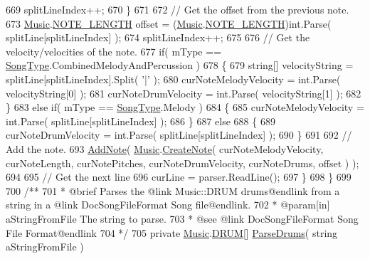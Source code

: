 \begin{DoxyCodeInclude}
669                 splitLineIndex++;
670             \}
671 
672             \textcolor{comment}{// Get the offset from the previous note.}
673             \hyperlink{class_music}{Music}.\hyperlink{group___music_enums_gaf11b5f079adbb21c800b9eca1c5c3cbd}{NOTE\_LENGTH} offset = (\hyperlink{class_music}{Music}.\hyperlink{group___music_enums_gaf11b5f079adbb21c800b9eca1c5c3cbd}{NOTE\_LENGTH})\textcolor{keywordtype}{int}.Parse( 
      splitLine[splitLineIndex] );
674             splitLineIndex++;
675 
676             \textcolor{comment}{// Get the velocity/velocities of the note.}
677             \textcolor{keywordflow}{if}( mType == \hyperlink{group___song_enums_gae681a1f001333e39fc1cb4fea97bfe1b}{SongType}.CombinedMelodyAndPercussion )
678             \{
679                 \textcolor{keywordtype}{string}[] velocityString = splitLine[splitLineIndex].Split( \textcolor{charliteral}{'|'} );
680                 curNoteMelodyVelocity = \textcolor{keywordtype}{int}.Parse( velocityString[0] );
681                 curNoteDrumVelocity = \textcolor{keywordtype}{int}.Parse( velocityString[1] );
682             \}
683             \textcolor{keywordflow}{else} \textcolor{keywordflow}{if}( mType == \hyperlink{group___song_enums_gae681a1f001333e39fc1cb4fea97bfe1b}{SongType}.Melody )
684             \{
685                 curNoteMelodyVelocity = \textcolor{keywordtype}{int}.Parse( splitLine[splitLineIndex] );
686             \}
687             \textcolor{keywordflow}{else}
688             \{
689                 curNoteDrumVelocity = \textcolor{keywordtype}{int}.Parse( splitLine[splitLineIndex] );
690             \}
691 
692             \textcolor{comment}{// Add the note.}
693             \hyperlink{group___song_pub_func_gab7c8fe4dc29f5ae7b7728c583fe51f7e}{AddNote}( \hyperlink{class_music}{Music}.\hyperlink{group___music_stat_func_gaaf74885e43eb623f64f961985fadcd08}{CreateNote}( curNoteMelodyVelocity, curNoteLength, 
      curNotePitches, curNoteDrumVelocity, curNoteDrums, offset ) );
694 
695             \textcolor{comment}{// Get the next line}
696             curLine = parser.ReadLine();
697         \}
698     \}
699 \textcolor{comment}{}
700 \textcolor{comment}{    /** }
701 \textcolor{comment}{     * @brief Parses the @link Music::DRUM drums@endlink from a string in a @link DocSongFileFormat Song
       file@endlink.}
702 \textcolor{comment}{     * @param[in] aStringFromFile The string to parse.}
703 \textcolor{comment}{     * @see @link DocSongFileFormat Song File Format@endlink}
704 \textcolor{comment}{    */}
705     \textcolor{keyword}{private} \hyperlink{class_music}{Music}.\hyperlink{group___music_enums_gade475b4382c7066d1af13e7c13c029b6}{DRUM}[] \hyperlink{group___song_priv_func_gaaa4ca12f0885a34cbfb09bb7a1db178b}{ParseDrums}( \textcolor{keywordtype}{string} aStringFromFile )

\end{DoxyCodeInclude}
